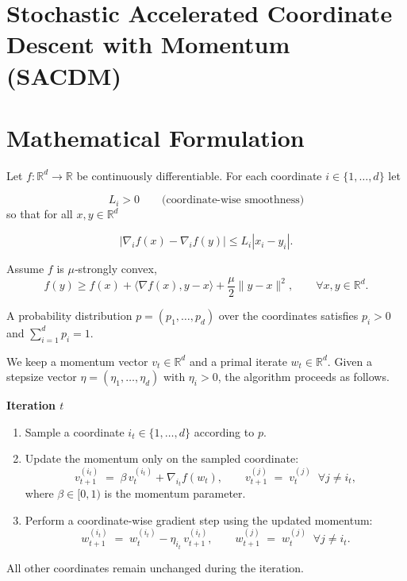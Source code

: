 \documentclass{article}
\newcommand{\R}{\mathbb{R}}
\begin{document}
\section*{Stochastic Accelerated Coordinate Descent with Momentum (SACDM)}

\section*{Mathematical Formulation}
Let $f:\R^{d}\rightarrow\R$ be continuously differentiable.  
For each coordinate $i\in\{1,\dots ,d\}$ let  

\[
L_i>0\qquad\text{(coordinate‑wise smoothness)} 
\]
so that for all $x,y\in\R^{d}$  

\[
\bigl|\nabla_i f(x)-\nabla_i f(y)\bigr|\le L_i |x_i-y_i| . \tag{1}
\]

Assume $f$ is $\mu$‑strongly convex,
\[
f(y)\ge f(x)+\langle\nabla f(x),y-x\rangle+\frac{\mu}{2}\|y-x\|^{2},\qquad\forall x,y\in\R^{d}. \tag{2}
\]

A probability distribution $p=(p_1,\dots ,p_d)$ over the coordinates satisfies $p_i>0$ and $\sum_{i=1}^{d}p_i=1$.

We keep a momentum vector $v_t\in\R^{d}$ and a primal iterate $w_t\in\R^{d}$.  
Given a stepsize vector $\eta=(\eta_1,\dots ,\eta_d)$ with $\eta_i>0$, the algorithm proceeds as follows.

\medskip
\noindent\textbf{Iteration $t$}  

\begin{enumerate}
\item Sample a coordinate $i_t\in\{1,\dots ,d\}$ according to $p$.
\item Update the momentum only on the sampled coordinate:
\[
v_{t+1}^{(i_t)} \;=\; \beta\,v_{t}^{(i_t)}+\nabla_{i_t} f(w_t),\qquad
v_{t+1}^{(j)} \;=\; v_{t}^{(j)}\;\;\forall j\neq i_t , \tag{3}
\]
where $\beta\in[0,1)$ is the momentum parameter.
\item Perform a coordinate‑wise gradient step using the updated momentum:
\[
w_{t+1}^{(i_t)} \;=\; w_{t}^{(i_t)}-\eta_{i_t}\, v_{t+1}^{(i_t)},\qquad
w_{t+1}^{(j)} \;=\; w_{t}^{(j)}\;\;\forall j\neq i_t . \tag{4}
\]
\end{enumerate}

All other coordinates remain unchanged during the iteration.  
\end{document}
